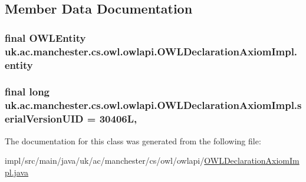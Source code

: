\subsection{Member Data Documentation}
\hypertarget{classuk_1_1ac_1_1manchester_1_1cs_1_1owl_1_1owlapi_1_1_o_w_l_declaration_axiom_impl_ad670ccd08ef4703402bd77ec5ff9348f}{
\subsubsection[{entity}]{\setlength{\rightskip}{0pt plus 5cm}final {\bf O\-W\-L\-Entity} uk.\-ac.\-manchester.\-cs.\-owl.\-owlapi.\-O\-W\-L\-Declaration\-Axiom\-Impl.\-entity\hspace{0.3cm}{\ttfamily [private]}}}\label{classuk_1_1ac_1_1manchester_1_1cs_1_1owl_1_1owlapi_1_1_o_w_l_declaration_axiom_impl_ad670ccd08ef4703402bd77ec5ff9348f}
\hypertarget{classuk_1_1ac_1_1manchester_1_1cs_1_1owl_1_1owlapi_1_1_o_w_l_declaration_axiom_impl_af016ff11b3e65d0e97bef762e127afc3}{
\subsubsection[{serial\-Version\-U\-I\-D}]{\setlength{\rightskip}{0pt plus 5cm}final long uk.\-ac.\-manchester.\-cs.\-owl.\-owlapi.\-O\-W\-L\-Declaration\-Axiom\-Impl.\-serial\-Version\-U\-I\-D = 30406\-L\hspace{0.3cm}{\ttfamily [static]}, {\ttfamily [private]}}}\label{classuk_1_1ac_1_1manchester_1_1cs_1_1owl_1_1owlapi_1_1_o_w_l_declaration_axiom_impl_af016ff11b3e65d0e97bef762e127afc3}


The documentation for this class was generated from the following file\-:\begin{DoxyCompactItemize}
\item 
impl/src/main/java/uk/ac/manchester/cs/owl/owlapi/\hyperlink{_o_w_l_declaration_axiom_impl_8java}{O\-W\-L\-Declaration\-Axiom\-Impl.\-java}\end{DoxyCompactItemize}

